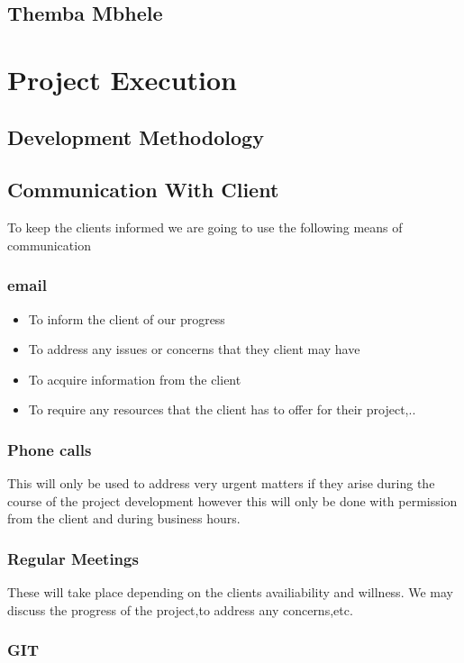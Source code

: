 \documentclass{scrartcl}
\begin{document}
\subsection{Themba Mbhele}

\section{Project Execution}
\subsection{Development Methodology}
\subsection{Communication With Client}
To keep the clients informed we are going to use the following means of communication
\subsubsection{email}
\begin{itemize}
\item To inform the client of our progress
\item To address any issues or concerns that they client may have
\item To acquire information from the client
\item To require any resources that the client has to offer for their project,..
\end{itemize}

\subsubsection{Phone calls}
 This will only be used to address very urgent matters if they arise during the course of the project development 
 however this will only be done with permission from the client and during business hours.
 
\subsubsection{Regular Meetings}	 
These will take place depending on the clients availiability and willness.
We may discuss the progress of the project,to address any concerns,etc.

\subsubsection{GIT}
\end{document}
